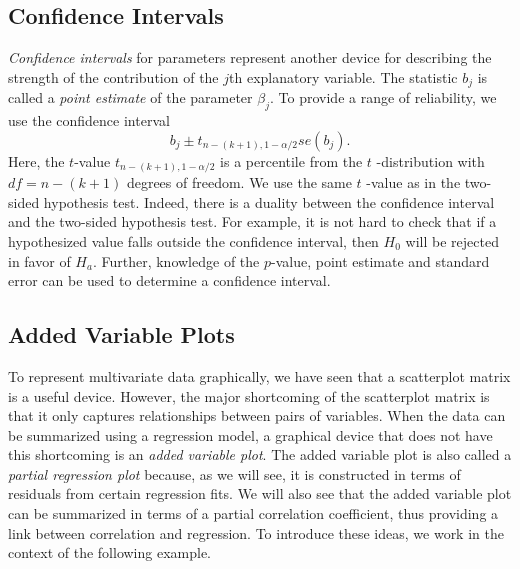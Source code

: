 \linejed

\subsection{Confidence Intervals}

\emph{Confidence intervals} for parameters represent another device
for describing the strength of the contribution of the $j$th
explanatory variable. The statistic $b_j$ is called a \emph{point
estimate} of the parameter $\beta_j$. To provide a range of
reliability, we use the confidence interval
\begin{equation}\label{E3:ConfIntb1}
b_j\pm t_{n-(k+1),1-\alpha /2}se(b_j).
\end{equation}%
Here, the $t$-value $t_{n-(k+1),1-\alpha /2}$ is a percentile from the $t$%
-distribution with $df=n-(k+1)$ degrees of freedom. We use the same $t$%
-value as in the two-sided hypothesis test. Indeed, there is a
duality between the confidence interval and the two-sided hypothesis
test. For example, it is not hard to check that if a hypothesized
value falls outside the confidence interval, then $H_0$ will be
rejected in favor of $H_{a}$. Further, knowledge of the $p$-value,
point estimate and standard error can be used to determine a
confidence interval.

\subsection{Added Variable Plots}

To represent multivariate data graphically, we have seen that a
scatterplot matrix is a useful device. However, the major
shortcoming of the scatterplot matrix is that it only captures
relationships between pairs of variables. When the data can be
summarized using a regression model, a graphical device that does
not have this shortcoming is an \emph{added variable plot}. The
added variable plot is also called a \emph{partial regression plot}
because, as we will see, it is constructed in terms of residuals
from certain regression fits. We will also see that the added
variable plot can be summarized in terms of a partial correlation
coefficient, thus providing a link between correlation and
regression. To introduce these ideas, we work in the context of the
following example.

\linejed


